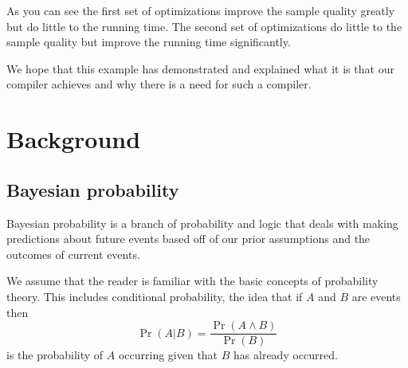 \documentclass[a4paper]{article}
\begin{document}
As you can see the first set of optimizations improve the sample quality greatly but do little to the running time. The second set of optimizations do little to the sample quality but improve the running time significantly.

We hope that this example has demonstrated and explained what it is that our compiler achieves and why there is a need for such a compiler.




\section{Background}




\subsection{Bayesian probability}

Bayesian probability is a branch of probability and logic that deals with making predictions about future events based off of our prior assumptions and the outcomes of current events.

We assume that the reader is familiar with the basic concepts of probability theory. This includes conditional probability, the idea that if \(A\) and \(B\) are events then
\[\Pr(A | B) = \frac{\Pr(A \land B)}{\Pr(B)}\]
is the probability of \(A\) occurring given that \(B\) has already occurred.
\end{document}
